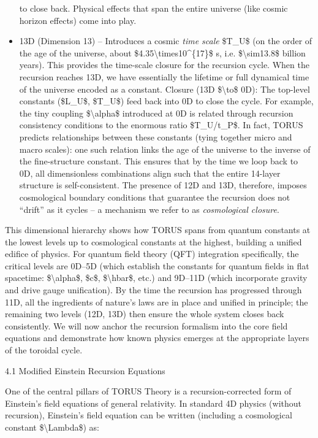 \documentclass[
]{article}
\begin{document}
\begin{itemize}
  to close back. Physical effects that span the entire universe (like
  cosmic horizon effects) come into play.
\item
  13D (Dimension 13) -- Introduces a cosmic \emph{time scale} \$T\_U\$
  (on the order of the age of the universe, about
  \$4.35\textbackslash times10\^{}\{17\}\$ s, i.e.
  \$\textbackslash sim13.8\$ billion years). This provides the
  time-scale closure for the recursion cycle. When the recursion reaches
  13D, we have essentially the lifetime or full dynamical time of the
  universe encoded as a constant. Closure (13D \$\textbackslash to\$
  0D): The top-level constants (\$L\_U\$, \$T\_U\$) feed back into 0D to
  close the cycle. For example, the tiny coupling
  \$\textbackslash alpha\$ introduced at 0D is related through recursion
  consistency conditions to the enormous ratio \$T\_U/t\_P\$. In fact,
  TORUS predicts relationships between these constants (tying together
  micro and macro scales): one such relation links the age of the
  universe to the inverse of the fine-structure constant. This ensures
  that by the time we loop back to 0D, all dimensionless combinations
  align such that the entire 14-layer structure is self-consistent. The
  presence of 12D and 13D, therefore, imposes cosmological boundary
  conditions that guarantee the recursion does not ``drift'' as it
  cycles -- a mechanism we refer to as \emph{cosmological closure}.
\end{itemize}

This dimensional hierarchy shows how TORUS spans from quantum constants
at the lowest levels up to cosmological constants at the highest,
building a unified edifice of physics. For quantum field theory (QFT)
integration specifically, the critical levels are 0D--5D (which
establish the constants for quantum fields in flat spacetime:
\$\textbackslash alpha\$, \$c\$, \$\textbackslash hbar\$, etc.) and
9D--11D (which incorporate gravity and drive gauge unification). By the
time the recursion has progressed through 11D, all the ingredients of
nature's laws are in place and unified in principle; the remaining two
levels (12D, 13D) then ensure the whole system closes back consistently.
We will now anchor the recursion formalism into the core field equations
and demonstrate how known physics emerges at the appropriate layers of
the toroidal cycle.

4.1 Modified Einstein Recursion Equations

One of the central pillars of TORUS Theory is a recursion-corrected form
of Einstein's field equations of general relativity. In standard 4D
physics (without recursion), Einstein's field equation can be written
(including a cosmological constant \$\textbackslash Lambda\$) as:
\end{document}
